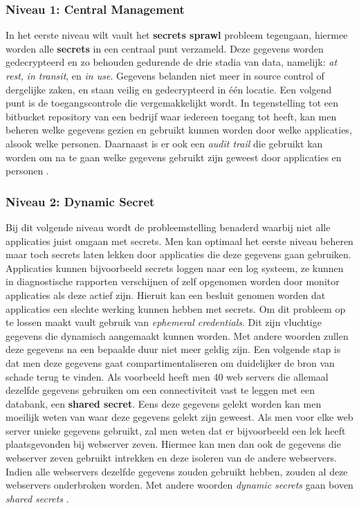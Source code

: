 \subsubsection{Niveau 1: Central Management}
In het eerste niveau wilt vault het \textbf{secrets sprawl} probleem tegengaan, hiermee worden alle \textbf{secrets} in een centraal punt verzameld. Deze gegevens worden gedecrypteerd en zo behouden gedurende de drie stadia van data, namelijk: \textit{at rest}, \textit{in transit}, en \textit{in use}. Gegevens belanden niet meer in source control of dergelijke zaken, en staan veilig en gedecrypteerd in één locatie. Een volgend punt is de toegangscontrole die vergemakkelijkt wordt. In tegenstelling tot een bitbucket repository van een bedrijf waar iedereen toegang tot heeft, kan men beheren welke gegevens gezien en gebruikt kunnen worden door welke applicaties, alsook welke personen. Daarnaast is er ook een \textit{audit trail} die gebruikt kan worden om na te gaan welke gegevens gebruikt zijn geweest door applicaties en personen \autocite{Dadgar2018}.

\subsubsection{Niveau 2: Dynamic Secret}

Bij dit volgende niveau wordt de probleemstelling benaderd waarbij niet alle applicaties juist omgaan met secrets. Men kan optimaal het eerste niveau beheren maar toch secrets laten lekken door applicaties die deze gegevens gaan gebruiken. Applicaties kunnen bijvoorbeeld secrets loggen naar een log systeem, ze kunnen in diagnostische rapporten verschijnen of zelf opgenomen worden door monitor applicaties als deze actief zijn. Hieruit kan een besluit genomen worden dat applicaties een slechte werking kunnen hebben met secrets. Om dit probleem op te lossen maakt vault gebruik van \textit{ephemeral credentials}. Dit zijn vluchtige gegevens die dynamisch aangemaakt kunnen worden. Met andere woorden zullen deze gegevens na een bepaalde duur niet meer geldig zijn. Een volgende stap is dat men deze gegevens gaat compartimentaliseren om duidelijker de bron van schade terug te vinden. Als voorbeeld heeft men 40 web servers die allemaal dezelfde gegevens gebruiken om een connectiviteit vast te leggen met een databank, een \textbf{shared secret}. Eens deze gegevens gelekt worden kan men moeilijk weten van waar deze gegevens gelekt zijn geweest. Als men voor elke web server unieke gegevens gebruikt, zal men weten dat er bijvoorbeeld een lek heeft plaatsgevonden bij webserver zeven. Hiermee kan men dan ook de gegevens die webserver zeven gebruikt intrekken en deze isoleren van de andere webservers. Indien alle webservers dezelfde gegevens zouden gebruikt hebben, zouden al deze webservers onderbroken worden. Met andere woorden \textit{dynamic secrets} gaan boven \textit{shared secrets} \autocite{Dadgar2018}.

